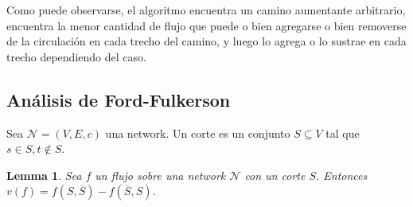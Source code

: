 \documentclass[a4paper]{article}
\newtheorem{lemma}{Lemma}
\newtheorem{lemma}{Lemma}
\begin{document}
Como puede observarse, el algoritmo encuentra un camino aumentante arbitrario,
encuentra la menor cantidad de flujo que puede o bien agregarse o bien removerse
de la circulación en cada trecho del camino, y luego lo agrega o lo sustrae en
cada trecho dependiendo del caso.

\subsection{Análisis de Ford-Fulkerson}

\begin{definition}
    Sea $\mathcal{N} = (V, E, c)$ una network. Un corte es un conjunto $S
    \subseteq V$ tal que $s \in S, t \not\in S$.
\end{definition}

\begin{lemma}
    Sea $f$ un flujo sobre una network $\mathcal{N}$ con un corte $S$. Entonces
    $v(f) = f(S, \overline{S}) - f(\overline{S}, S)$.
\end{lemma}
\end{document}
